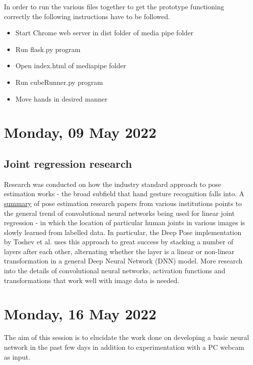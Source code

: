 In order to run the various files together to get the prototype functioning correctly the following instructions have to be followed. 
\begin{itemize}
    \item Start Chrome web server in dist folder of media pipe folder
    \item Run flask.py program
    \item Open index.html of mediapipe folder
    \item Run cubeRunner.py program
    \item Move hands in desired manner
\end{itemize}

\section[2022/05/09]{Monday, 09 May 2022}

\subsection{Joint regression research}

Research was conducted on how the industry standard approach to pose estimation works - the broad subfield that hand gesture recognition falls into. A \href{https://heartbeat.comet.ml/a-2019-guide-to-human-pose-estimation-c10b79b64b73#0057}{summary} of pose estimation research papers from various institutions points to the general trend of convolutional neural networks being used for linear joint regression - in which the location of particular human joints in various images is slowly learned from labelled data. In particular, the Deep Pose implementation \cite{deep_pose} by Toshev et al. uses this approach to great success by stacking a number of layers after each other, alternating whether the layer is a linear or non-linear transformation in a general Deep Neural Network (DNN) model. More research into the details of convolutional neural networks, activation functions and transformations that work well with image data is needed.\\ 

\section[2022/05/16]{Monday, 16 May 2022}

The aim of this session is to elucidate the work done on developing a basic neural network in the past few days in addition to experimentation with a PC webcam as input.


